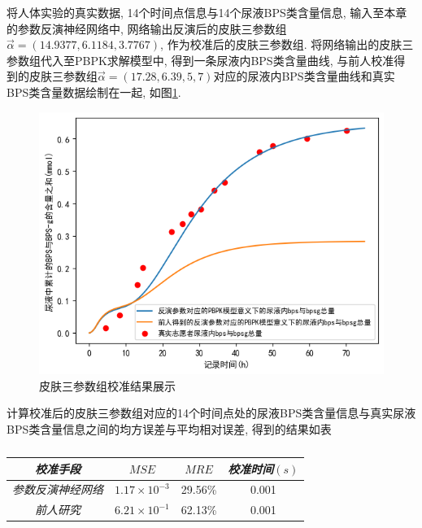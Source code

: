 \documentclass[a4paper,punct=banjiao,twoside]{ctexrep}
\theoremstyle{plain}
\theoremstyle{definition}
\theoremstyle{remark}
\begin{document}
将人体实验的真实数据, 14个时间点信息与14个尿液BPS类含量信息, 输入至本章的参数反演神经网络中, 网络输出反演后的皮肤三参数组$\vec{\alpha}=(14.9377,  6.1184,  3.7767)$, 作为校准后的皮肤三参数组.
将网络输出的皮肤三参数组代入至PBPK求解模型中, 得到一条尿液内BPS类含量曲线, 与前人校准得到的皮肤三参数组$\vec{\alpha}=(17.28,  6.39,  5,7)$对应的尿液内BPS类含量曲线和真实BPS类含量数据绘制在一起, 如图\ref{校准}.
\begin{figure}[H]
  \centering
  \includegraphics[scale=0.6]{./figs/p8.png}
  \caption{皮肤三参数组校准结果展示}
  \label{校准}
\end{figure}
\noindent 计算校准后的皮肤三参数组对应的14个时间点处的尿液BPS类含量信息与真实尿液BPS类含量信息之间的均方误差与平均相对误差, 得到的结果如表

\begin{table}[htbp]
  \centering
  \begin{tabular}[t]{c*{3}{c}}
    \hline
    \textit{校准手段} &$MSE$&$MRE$&\textit{校准时间}$(s)$\\
    \hline
    \textit{参数反演神经网络} & $1.17\times 10^{-3}$  &   29.56\% &0.001   \\ 
    \textit{前人研究} & $6.21\times 10^{-1}$  &  62.13\%    &0.001   \\ 
    \hline
  \end{tabular}
  \caption{\label{tab8}} 
\end{table}  
\end{document}
